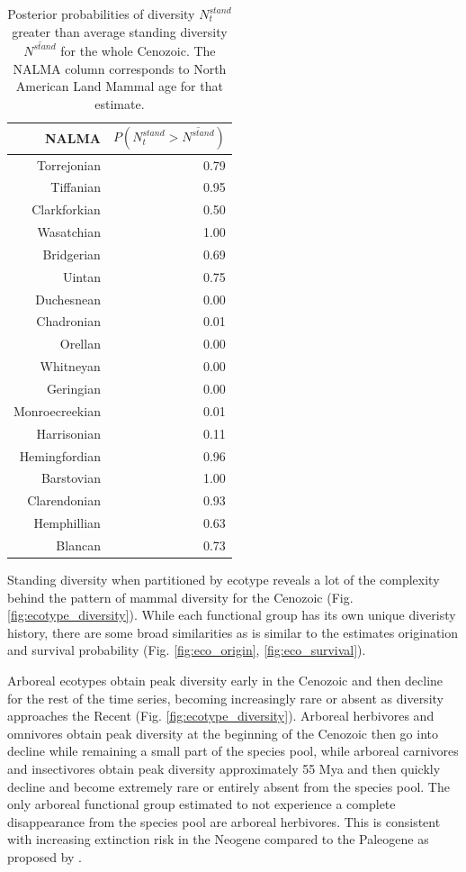 \documentclass[12pt,letterpaper]{article}
\begin{document}
\begin{table}[ht]
  \centering
  \caption[Posterior probability estimates of a peak in diversity]{Posterior probabilities of diversity \(N^{stand}_{t}\) greater than average standing diversity \(\overline{N^{stand}}\) for the whole Cenozoic. The NALMA column corresponds to North American Land Mammal age for that estimate.}
  \label{tab:div_peak}
  \begin{tabular}{ r r }
    \hline
    NALMA & \(P(N^{stand}_{t} > \overline{N^{stand}})\) \\
    \hline
    Torrejonian & 0.79 \\ 
    Tiffanian & 0.95 \\ 
    Clarkforkian & 0.50 \\ 
    Wasatchian & 1.00 \\ 
    Bridgerian & 0.69 \\ 
    Uintan & 0.75 \\ 
    Duchesnean & 0.00 \\ 
    Chadronian & 0.01 \\ 
    Orellan & 0.00 \\ 
    Whitneyan & 0.00 \\ 
    Geringian & 0.00 \\ 
    Monroecreekian & 0.01 \\ 
    Harrisonian & 0.11 \\ 
    Hemingfordian & 0.96 \\ 
    Barstovian & 1.00 \\ 
    Clarendonian & 0.93 \\ 
    Hemphillian & 0.63 \\ 
    Blancan & 0.73 \\ 
    \hline
  \end{tabular}
\end{table}


Standing diversity when partitioned by ecotype reveals a lot of the complexity behind the pattern of mammal diversity for the Cenozoic (Fig. \ref{fig:ecotype_diversity}). While each functional group has its own unique diveristy history, there are some broad similarities as is similar to the estimates origination and survival probability (Fig. \ref{fig:eco_origin}, \ref{fig:eco_survival}).

Arboreal ecotypes obtain peak diversity early in the Cenozoic and then decline for the rest of the time series, becoming increasingly rare or absent as diversity approaches the Recent (Fig. \ref{fig:ecotype_diversity}). Arboreal herbivores and omnivores obtain peak diversity at the beginning of the Cenozoic then go into decline while remaining a small part of the species pool, while arboreal carnivores and insectivores obtain peak diversity approximately 55 Mya and then quickly decline and become extremely rare or entirely absent from the species pool. The only arboreal functional group estimated to not experience a complete disappearance from the species pool are arboreal herbivores. This is consistent with increasing extinction risk in the Neogene compared to the Paleogene as proposed by \citet{Smits2015b}.
\end{document}

